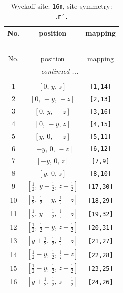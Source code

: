 \documentclass[fleqn,8pt]{jsarticle}
\begin{document}
\renewcommand{\arraystretch}{1.2}
\begin{longtable}{ccc}
\caption{Wyckoff site: {\tt 16n}, site symmetry: {\tt .m'.}}
 \\
 \hline \hline
No. & position & mapping \\ \hline \endfirsthead

\multicolumn{2}{l}{\tablename\ \thetable{}} \\
 \hline \hline
No. & position & mapping \\ \hline \endhead

 \hline \hline
\multicolumn{2}{r}{\footnotesize\it continued ...} \\ \endfoot

 \hline \hline
\multicolumn{2}{r}{} \\ \endlastfoot

1 & $\left[ 0,\, y,\, z \right]$ & {\tt [1,14]} \\ \hline
2 & $\left[ 0,\, - y,\, - z \right]$ & {\tt [2,13]} \\ \hline
3 & $\left[ 0,\, y,\, - z \right]$ & {\tt [3,16]} \\ \hline
4 & $\left[ 0,\, - y,\, z \right]$ & {\tt [4,15]} \\ \hline
5 & $\left[ y,\, 0,\, - z \right]$ & {\tt [5,11]} \\ \hline
6 & $\left[ - y,\, 0,\, - z \right]$ & {\tt [6,12]} \\ \hline
7 & $\left[ - y,\, 0,\, z \right]$ & {\tt [7,9]} \\ \hline
8 & $\left[ y,\, 0,\, z \right]$ & {\tt [8,10]} \\ \hline
9 & $\left[ \frac{1}{2},\, y + \frac{1}{2},\, z + \frac{1}{2} \right]$ & {\tt [17,30]} \\ \hline
10 & $\left[ \frac{1}{2},\, \frac{1}{2} - y,\, \frac{1}{2} - z \right]$ & {\tt [18,29]} \\ \hline
11 & $\left[ \frac{1}{2},\, y + \frac{1}{2},\, \frac{1}{2} - z \right]$ & {\tt [19,32]} \\ \hline
12 & $\left[ \frac{1}{2},\, \frac{1}{2} - y,\, z + \frac{1}{2} \right]$ & {\tt [20,31]} \\ \hline
13 & $\left[ y + \frac{1}{2},\, \frac{1}{2},\, \frac{1}{2} - z \right]$ & {\tt [21,27]} \\ \hline
14 & $\left[ \frac{1}{2} - y,\, \frac{1}{2},\, \frac{1}{2} - z \right]$ & {\tt [22,28]} \\ \hline
15 & $\left[ \frac{1}{2} - y,\, \frac{1}{2},\, z + \frac{1}{2} \right]$ & {\tt [23,25]} \\ \hline
16 & $\left[ y + \frac{1}{2},\, \frac{1}{2},\, z + \frac{1}{2} \right]$ & {\tt [24,26]} \\
\end{longtable}
\end{document}
